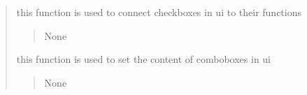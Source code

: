 \documentclass[letterpaper,10pt,english]{sphinxmanual}
\begin{document}
\begin{quote}
\begin{savenotes}
\begin{fulllineitems}
\begin{savenotes}
\begin{fulllineitems}
\begin{quote}
\begin{description}
\begin{itemize}
\end{itemize}

\end{description}\end{quote}

\end{fulllineitems}\end{savenotes}


\begin{savenotes}\begin{fulllineitems}
\label{\detokenize{setting/setting_UI:oxin.setting_UI.UI_main_window.set_checkboxes}}
\pysigstartsignatures
{}
\pysigstopsignatures
\sphinxAtStartPar
this function is used to connect checkboxes in ui to their functions
\begin{quote}\begin{description}
\sphinxAtStartPar
None

\end{description}\end{quote}

\end{fulllineitems}\end{savenotes}


\begin{savenotes}\begin{fulllineitems}
\label{\detokenize{setting/setting_UI:oxin.setting_UI.UI_main_window.set_combo_boxes}}
\pysigstartsignatures
{}
\pysigstopsignatures
\sphinxAtStartPar
this function is used to set the content of comboboxes in ui
\begin{quote}\begin{description}
\sphinxAtStartPar
None

\end{description}\end{quote}

\end{fulllineitems}\end{savenotes}


\end{fulllineitems}
\end{savenotes}
\end{quote}
\end{document}
